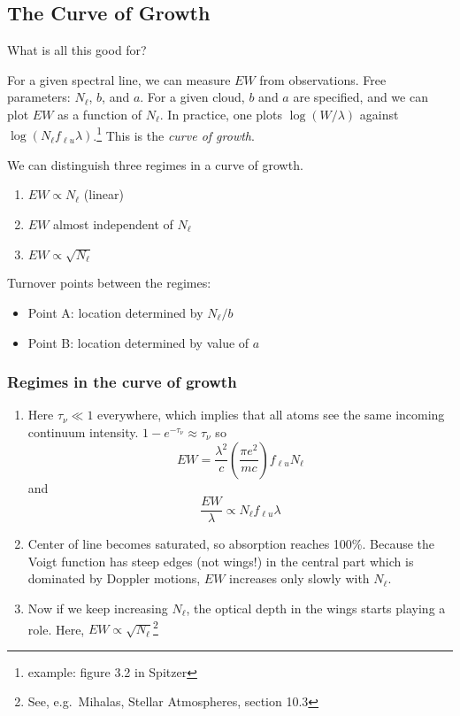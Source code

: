 \documentclass[11pt]{article}
\newcommand{\mar}[1]{\hspace{0pt}\marginpar{-\textcolor{black}{#1}-}}
\begin{document}
\subsection{The Curve of Growth}
What is all this good for?

For a given spectral line, we can measure $EW$ from observations.
Free parameters: $N_{\ell}$, $b$, and $a$. For a given cloud, $b$
and $a$ are specified, and we can plot $EW$ as a function of $N_{\ell}$.
In practice, one plots $\log(W/\lambda) $ against
$\log ( N_{\ell}f_{\ell{u}}\lambda ) $.\footnote{
    example: figure 3.2 in Spitzer}
This is the \textit{curve of growth}.

We can distinguish three regimes in a curve of growth.
\begin{enumerate}[label={\Roman*}.]
    \item \mar{93}$EW \propto N_{\ell}$ (linear)
    \item $EW$ almost independent of $N_{\ell}$
    \item $EW \propto \sqrt{N_{\ell}}$
\end{enumerate}
Turnover points between the regimes:
\begin{itemize}
    \item Point A: location determined by $N_{\ell}/b$
    \item Point B: location determined by value of $a$
\end{itemize}

\subsubsection{Regimes in the curve of growth}
\begin{enumerate}[label={\Roman*}.]
    \item Here $\tau_{\nu} \ll 1$ everywhere, which implies that all atoms
        see the same incoming continuum intensity.
        $ 1 - e^{-\tau_{\nu}} \approx \tau_{\nu} $ so
        \[
            EW = \frac{\lambda^{2}}{c} \left( \frac{{\pi}e^{2}}{mc} \right)
            f_{{\ell}u} N_{\ell}
            \]
        and
        \[
            \frac{EW}{\lambda} \propto N_{\ell} f_{{\ell}u} \lambda
            \]
    \item Center of line becomes saturated, so absorption reaches 100\%.
        Because the Voigt function has steep edges (not wings!) in the
        central part which is dominated by Doppler motions, $EW$ increases
        only slowly with $N_{\ell}$.
    \item Now if we keep increasing $N_{\ell}$, the optical depth in the wings
        starts playing a role. Here, $EW \propto \sqrt{N_{\ell}}$\footnote{
            See, e.g.\ Mihalas, Stellar Atmospheres, section 10.3}
\end{enumerate}
\end{document}
